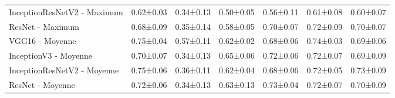 \begin{landscape}
\begin{table}[]
\begin{tabular}{lllllll}
InceptionResNetV2  - Maximum  & 0.62±0.03          & 0.34±0.13          & 0.50±0.05         & 0.56±0.11         & 0.61±0.08             & 0.60±0.07 \\
ResNet - Maximum              & 0.68±0.09          & 0.35±0.14          & 0.58±0.05         & 0.70±0.07         & 0.72±0.09             & 0.70±0.07 \\
VGG16 - Moyenne               & 0.75±0.04          & 0.57±0.11          & 0.62±0.02         & 0.68±0.06         & 0.74±0.03             & 0.69±0.06 \\
InceptionV3 - Moyenne         & 0.70±0.07          & 0.34±0.13          & 0.65±0.06         & 0.72±0.06         & 0.72±0.07             & 0.69±0.09 \\
InceptionResNetV2 - Moyenne   & 0.75±0.06          & 0.36±0.11          & 0.62±0.04         & 0.68±0.06         & 0.72±0.05             & 0.73±0.09 \\
\rowcolor[HTML]{E7E6E6} 
ResNet - Moyenne        & 0.72±0.06                 & 0.34±0.13          & 0.63±0.13         & 0.73±0.04         & 0.72±0.07             & 0.70±0.09
\end{tabular}
\label{tab:image_classification_ss}
\end{table}
\end{landscape}



